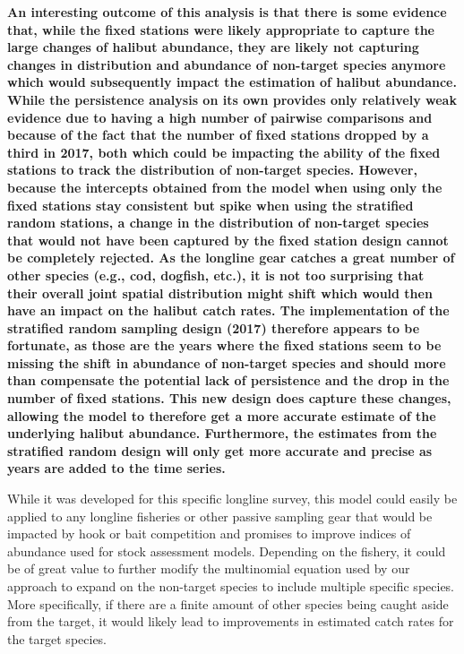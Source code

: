 \documentclass[12pt]{article}\usepackage[]{graphicx}\usepackage[]{color}
\begin{document}
\textbf{An interesting outcome of this analysis is that there is some evidence that, while the fixed stations were likely appropriate to capture the large changes of halibut abundance, they are likely not capturing changes in distribution and abundance of non-target species anymore which would subsequently impact the estimation of halibut abundance. While the persistence analysis on its own provides only relatively weak evidence due to having a high number of pairwise comparisons and because of the fact that the number of fixed stations dropped by a third in 2017, both which could be impacting the ability of the fixed stations to track the distribution of non-target species. However, because the intercepts obtained from the model when using only the fixed stations stay consistent but spike when using the stratified random stations, a change in the distribution of non-target species that would not have been captured by the fixed station design cannot be completely rejected. As the longline gear catches a great number of other species (e.g., cod, dogfish, etc.), it is not too surprising that their overall joint spatial distribution might shift which would then have an impact on the halibut catch rates. The implementation of the stratified random sampling design (2017) therefore appears to be fortunate, as those are the years where the fixed stations seem to be missing the shift in abundance of non-target species and should more than compensate the potential lack of persistence and the drop in the number of fixed stations. This new design does capture these changes, allowing the model to therefore get a more accurate estimate of the underlying halibut abundance. Furthermore, the estimates from the stratified random design will only get more accurate and precise as years are added to the time series.}

While it was developed for this specific longline survey, this model could easily be applied to any longline fisheries or other passive sampling gear that would be impacted by hook or bait competition and promises to improve indices of abundance used for stock assessment models. Depending on the fishery, it could be of great value to further modify the multinomial equation used by our approach to expand on the non-target species to include multiple specific species. More specifically, if there are a finite amount of other species being caught aside from the target, it would likely lead to improvements in estimated catch rates for the target species.
\end{document}
